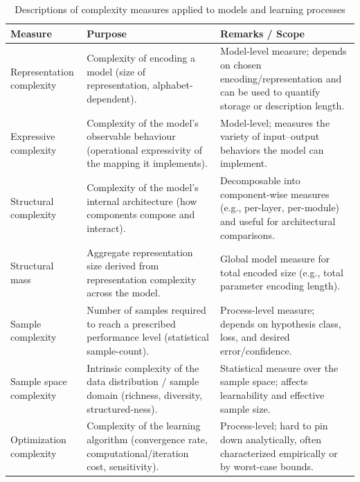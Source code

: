 \documentclass[10pt]{article} %
\begin{document}
\begin{table}[htb]
  \centering
  \footnotesize
  \begin{threeparttable}
    \caption{Descriptions of complexity measures applied to models and learning processes}
    \label{tab:complexity-measures}
    \begin{tabularx}{\textwidth}{@{} >{\RaggedRight\arraybackslash}X
                                     >{\RaggedRight\arraybackslash}X
                                     >{\RaggedRight\arraybackslash}X @{}}
      \toprule
      \textbf{Measure} & \textbf{Purpose} & \textbf{Remarks / Scope} \\
      \midrule
      Representation complexity
        & Complexity of encoding a model (size of representation, alphabet-dependent).
        & Model-level measure; depends on chosen encoding/representation and can be used to quantify storage or description length. \\
      \addlinespace[2pt]
      Expressive complexity
        & Complexity of the model's observable behaviour (operational expressivity of the mapping it implements).
        & Model-level; measures the variety of input–output behaviors the model can implement. \\
      \addlinespace[2pt]
      Structural complexity
        & Complexity of the model's internal architecture (how components compose and interact).
        & Decomposable into component-wise measures (e.g., per-layer, per-module) and useful for architectural comparisons. \\
      \addlinespace[2pt]
      Structural mass
        & Aggregate representation size derived from representation complexity across the model.
        & Global model measure for total encoded size (e.g., total parameter encoding length). \\
      \addlinespace[2pt]
      Sample complexity
        & Number of samples required to reach a prescribed performance level (statistical sample-count).
        & Process-level measure; depends on hypothesis class, loss, and desired error/confidence. \\
      \addlinespace[2pt]
      Sample space complexity
        & Intrinsic complexity of the data distribution / sample domain (richness, diversity, structured-ness).
        & Statistical measure over the sample space; affects learnability and effective sample size. \\
      \addlinespace[2pt]
      Optimization complexity
        & Complexity of the learning algorithm (convergence rate, computational/iteration cost, sensitivity).
        & Process-level; hard to pin down analytically, often characterized empirically or by worst-case bounds. \\
      \bottomrule
    \end{tabularx}


\end{threeparttable}
\end{table}
\end{document}
